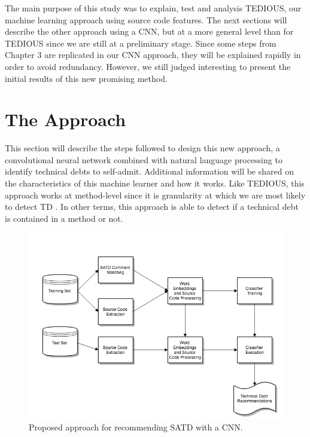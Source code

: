 The main purpose of this study was to explain, test and analysis TEDIOUS, our machine learning approach using source code features. The next sections will describe the other approach using a CNN, but at a more general level than for TEDIOUS since we are still at a preliminary stage. Since some steps from Chapter 3 are replicated in our CNN approach, they will be explained rapidly in order to avoid redundancy. However, we still judged interesting to present the initial results of this new promising method.

\section{The Approach}


This section will describe the steps followed to design this new approach, a convolutional neural network combined with natural language processing to identify technical debts to self-admit. Additional information will be shared on the characteristics of this machine learner and how it works. Like TEDIOUS, this approach works at method-level since it is granularity at which we are most likely to detect TD \citep{PotdarS14}. In other terms, this approach is able to detect if a technical debt is contained in a method or not.

\begin{figure}[t]
	\centering
	\includegraphics[width=\linewidth]{figs/CNN.png}
	\caption{Proposed approach for recommending SATD with a CNN.}
	\label{fig:CNN}
	\vspace{-4mm}
\end{figure}

